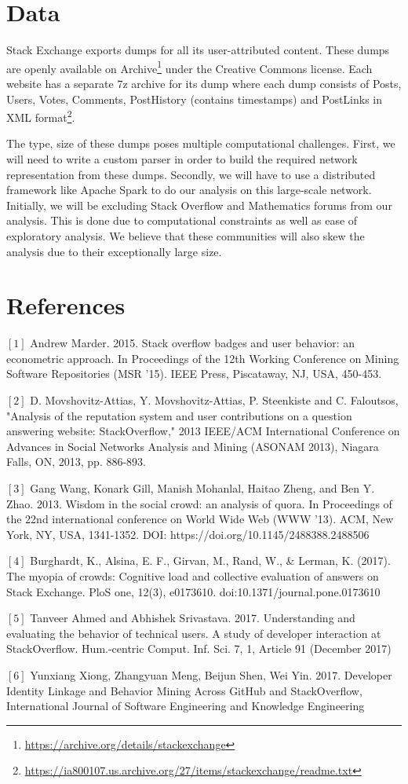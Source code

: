 \documentclass[11pt,a4paper,final]{article}
\begin{document}
\section{Data}
Stack Exchange exports dumps for all its user-attributed content. These dumps are openly available on Archive\footnote{\url{https://archive.org/details/stackexchange}} under the Creative Commons license. Each website has a separate 7z archive for its dump where each dump consists of Posts, Users, Votes, Comments, PostHistory (contains timestamps) and PostLinks in XML format\footnote{\url{https://ia800107.us.archive.org/27/items/stackexchange/readme.txt}}.

The type, size of these dumps poses multiple computational challenges. First, we will need to write a custom parser in order to build the required network representation from these dumps. Secondly, we will have to use a distributed framework like Apache Spark to do our analysis on this large-scale network. 
Initially, we will be excluding Stack Overflow and Mathematics forums from our analysis. This is done due to computational constraints as well as ease of exploratory analysis. We believe that these communities will also skew the analysis due to their exceptionally large size.


\section*{References}


$\left[1\right]$ Andrew Marder. 2015. Stack overflow badges and user behavior: an econometric approach. In Proceedings of the 12th Working Conference on Mining Software Repositories (MSR '15). IEEE Press, Piscataway, NJ, USA, 450-453.

\noindent
$\left[2\right]$ D. Movshovitz-Attias, Y. Movshovitz-Attias, P. Steenkiste and C. Faloutsos, "Analysis of the reputation system and user contributions on a question answering website: StackOverflow," 2013 IEEE/ACM International Conference on Advances in Social Networks Analysis and Mining (ASONAM 2013), Niagara Falls, ON, 2013, pp. 886-893.

\noindent
$\left[3\right]$ Gang Wang, Konark Gill, Manish Mohanlal, Haitao Zheng, and Ben Y. Zhao. 2013. Wisdom in the social crowd: an analysis of quora. In Proceedings of the 22nd international conference on World Wide Web (WWW '13). ACM, New York, NY, USA, 1341-1352. DOI: https://doi.org/10.1145/2488388.2488506

\noindent
$\left[4\right]$ Burghardt, K., Alsina, E. F., Girvan, M., Rand, W., \& Lerman, K. (2017). The myopia of crowds: Cognitive load and collective evaluation of answers on Stack Exchange. PloS one, 12(3), e0173610. doi:10.1371/journal.pone.0173610

\noindent
$\left[5\right]$ Tanveer Ahmed and Abhishek Srivastava. 2017. Understanding and evaluating the behavior of technical users. A study of developer interaction at StackOverflow. Hum.-centric Comput. Inf. Sci. 7, 1, Article 91 (December 2017)

\noindent
$\left[6\right]$ Yunxiang Xiong, Zhangyuan Meng, Beijun Shen, Wei Yin. 2017. Developer Identity Linkage and Behavior Mining Across GitHub and StackOverflow, International Journal of Software Engineering and Knowledge Engineering
\end{document}
